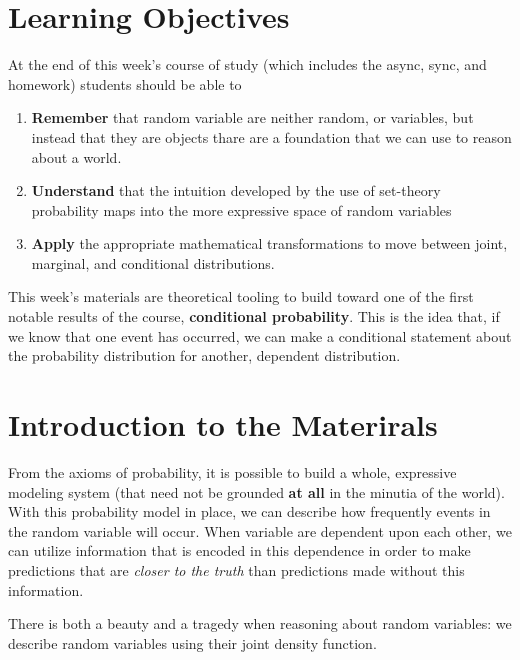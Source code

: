 \documentclass[
  letterpaper,
  DIV=11,
  numbers=noendperiod]{scrreprt}
\providecommand{\tightlist}{%
  \setlength{\itemsep}{0pt}\setlength{\parskip}{0pt}}\usepackage{longtable,booktabs,array}
\begin{document}
\section{Learning Objectives}\label{learning-objectives-1}

At the end of this week's course of study (which includes the async,
sync, and homework) students should be able to

\begin{enumerate}
\def\labelenumi{\arabic{enumi}.}
\tightlist
\item
  \textbf{Remember} that random variable are neither random, or
  variables, but instead that they are objects thare are a foundation
  that we can use to reason about a world.
\item
  \textbf{Understand} that the intuition developed by the use of
  set-theory probability maps into the more expressive space of random
  variables
\item
  \textbf{Apply} the appropriate mathematical transformations to move
  between joint, marginal, and conditional distributions.
\end{enumerate}

This week's materials are theoretical tooling to build toward one of the
first notable results of the course, \textbf{conditional probability}.
This is the idea that, if we know that one event has occurred, we can
make a conditional statement about the probability distribution for
another, dependent distribution.

\section{Introduction to the
Materirals}\label{introduction-to-the-materirals}

From the axioms of probability, it is possible to build a whole,
expressive modeling system (that need not be grounded \textbf{at all} in
the minutia of the world). With this probability model in place, we can
describe how frequently events in the random variable will occur. When
variable are dependent upon each other, we can utilize information that
is encoded in this dependence in order to make predictions that are
\emph{closer to the truth} than predictions made without this
information.

There is both a beauty and a tragedy when reasoning about random
variables: we describe random variables using their joint density
function.
\end{document}
